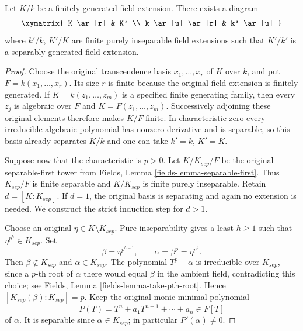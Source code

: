 \begin{lemma}
\label{lemma-make-separably-generated}
Let $K/k$ be a finitely generated field extension.
There exists a diagram
$$
\xymatrix{
K \ar[r] & K' \\
k \ar[u] \ar[r] & k' \ar[u]
}
$$
where $k'/k$, $K'/K$ are finite purely inseparable field
extensions such that $K'/k'$ is a separably generated field extension.
\end{lemma}

\begin{proof}
Choose the original transcendence basis
$x_1,\ldots,x_r$ of $K$ over $k$, and put
$F=k(x_1,\ldots,x_r)$. Its size $r$ is finite
because the original field extension is finitely
generated. If $K=k(z_1,\ldots,z_m)$ is a specified
finite generating family, then every $z_j$ is
algebraic over $F$ and $K=F(z_1,\ldots,z_m)$.
Successively adjoining these original elements
therefore makes $K/F$ finite. In characteristic
zero every irreducible algebraic polynomial has
nonzero derivative and is separable, so this
basis already separates $K/k$ and one can take
$k'=k$, $K'=K$.

Suppose now that the characteristic is $p>0$.
Let $K/K_{sep}/F$ be the original separable-first
tower from Fields, Lemma \ref{fields-lemma-separable-first}.
Thus $K_{sep}/F$ is finite separable and
$K/K_{sep}$ is finite purely inseparable. Retain
$d=[K:K_{sep}]$. If $d=1$, the original basis
is separating and again no extension is needed.
We construct the strict induction step for $d>1$.

Choose an original $\eta\in K\setminus K_{sep}$.
Pure inseparability gives a least $h\geq1$
such that $\eta^{p^h}\in K_{sep}$. Set
$$
\beta=\eta^{p^{h-1}},\qquad
\alpha=\beta^p=\eta^{p^h}.
$$
Then $\beta\notin K_{sep}$ and
$\alpha\in K_{sep}$. The polynomial $T^p-\alpha$
is irreducible over $K_{sep}$, since a $p$-th
root of $\alpha$ there would equal $\beta$
in the ambient field, contradicting this choice;
see Fields, Lemma \ref{fields-lemma-take-pth-root}.
Hence $[K_{sep}(\beta):K_{sep}]=p$.
Keep the original monic minimal polynomial
$$
P(T)=T^n+a_1T^{n-1}+\cdots+a_n\in F[T]
$$
of $\alpha$. It is separable since
$\alpha\in K_{sep}$; in particular $P'(\alpha)\ne0$.


\end{proof}
